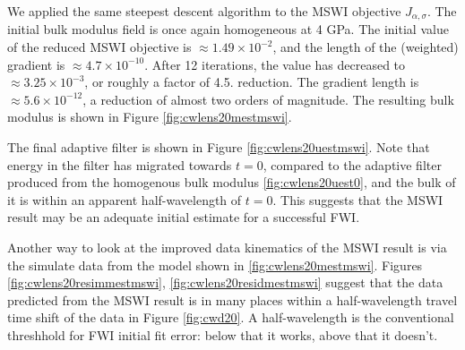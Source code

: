 
We applied the same steepest descent algorithm to the MSWI objective
$J_{\alpha,\sigma}$. The initial bulk modulus field is once again
homogeneous at 4 GPa. The initial value of the reduced MSWI objective
is $\approx 1.49 \times 10^{-2}$, and the length of the (weighted)
gradient is $\approx 4.7 \times 10^{-10}$. After 12 iterations, the value has
decreased to $\approx 3.25 \times 10^{-3}$, or roughly a factor of 4.5.
reduction. The gradient length is
$\approx 5.6 \times 10^{-12}$, a reduction of almost two orders of
magnitude. The resulting bulk modulus is shown in Figure
\ref{fig:cwlens20mestmswi}.


The final adaptive filter is shown in Figure
\ref{fig:cwlens20uestmswi}. Note that energy in the filter has
migrated towards $t=0$, compared to the adaptive filter produced from
the homogenous bulk modulus \ref{fig:cwlens20uest0}, and the bulk of
it is within an apparent half-wavelength of $t=0$. This suggests that
the MSWI result may be an adequate initial estimate for a successful
FWI.


Another way to look at the improved data kinematics of the MSWI result
is via the simulate data from the model shown in
\ref{fig:cwlens20mestmswi}. Figures \ref{fig:cwlens20resimmestmswi},
\ref{fig:cwlens20residmestmswi} suggest that the
data predicted from the MSWI result is in many places within a
half-wavelength travel time shift of the data in Figure \ref{fig:cwd20}.
A half-wavelength is the conventional threshhold for FWI initial fit
error: below that it works, above that it doesn't.


